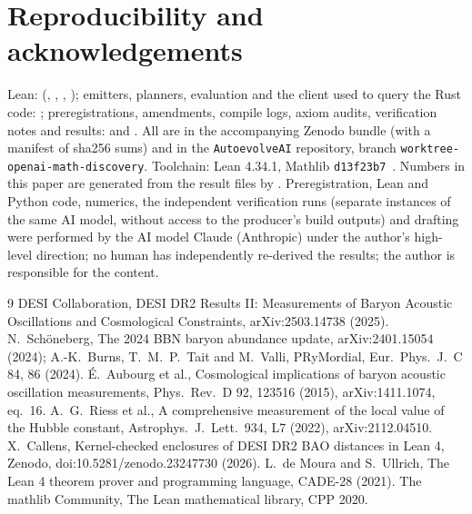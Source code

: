 \documentclass[11pt]{article}
\begin{document}
\section*{Reproducibility and acknowledgements}
Lean:  (, , , ); emitters, planners, evaluation and the client used to query the Rust code: ;
preregistrations, amendments, compile logs, axiom audits, verification notes and results:  and . All are in the accompanying
Zenodo bundle (with a manifest of sha256 sums) and in the \texttt{AutoevolveAI} repository, branch \texttt{worktree-openai-math-discovery}. Toolchain: Lean 4.34.1, Mathlib \texttt{d13f23b7}~\cite{lean,mathlib}.
Numbers in this paper are generated from the result files by .
Preregistration, Lean and Python code, numerics, the independent verification runs (separate instances of the same AI model, without access to the producer's build outputs) and
drafting were performed by the AI model Claude (Anthropic) under the author's high-level direction; no human has independently re-derived the results; the author is responsible for the content.

\begin{thebibliography}{9}
 DESI Collaboration, DESI DR2 Results II: Measurements of Baryon Acoustic Oscillations and Cosmological Constraints, arXiv:2503.14738 (2025).
 N.~Sch\"oneberg, The 2024 BBN baryon abundance update, arXiv:2401.15054 (2024); A.-K.~Burns, T.~M.~P.~Tait and M.~Valli, PRyMordial, Eur.\ Phys.\ J.\ C 84, 86 (2024).
 \'E.~Aubourg et al., Cosmological implications of baryon acoustic oscillation measurements, Phys.\ Rev.\ D 92, 123516 (2015), arXiv:1411.1074, eq.~16.
 A.~G.~Riess et al., A comprehensive measurement of the local value of the Hubble constant, Astrophys.\ J.\ Lett.\ 934, L7 (2022), arXiv:2112.04510.
 X.~Callens, Kernel-checked enclosures of DESI DR2 BAO distances in Lean 4, Zenodo, doi:10.5281/zenodo.23247730 (2026).
 L.~de Moura and S.~Ullrich, The Lean 4 theorem prover and programming language, CADE-28 (2021).
 The mathlib Community, The Lean mathematical library, CPP 2020.
\end{thebibliography}
\end{document}
